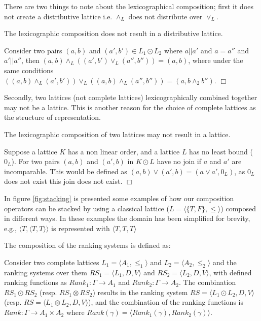 There are two things to note about the lexicographical composition; 
first it does not create a distributive lattice i.e. $\wedge_L$ does not distribute over $\vee_L$.
\begin{prop}
The lexicographic composition does not result in a distributive lattice.
\end{prop}
\begin{prof}
Consider two pairs $(a,b)$ and $(a', b') \in L_1 \odot L_2$ where $a || a'$ and $a = a''$ and $a' || a''$,
then $(a,b) \wedge_{L} ((a', b') \vee_{L} (a'', b'')) = (a,b)$,
where under the same conditions $((a,b) \wedge_{L} (a', b')) \vee_{L} ((a,b) \wedge_{L} (a'', b'')) = (a,b \wedge_2 b'')$.
$\Box$\end{prof}

Secondly, two lattices (not complete lattices) lexicographically combined together may not be a lattice. 
This is another reason for the choice of complete lattices as the structure of representation.
\begin{prop}
The lexicographic composition of two lattices may not result in a lattice.
\end{prop}
\begin{prof}
Suppose a lattice $K$ has a non linear order, and a lattice $L$ has no least bound ($0_L$). 
For two pairs $(a,b)$ and $(a',b)$ in $K \odot L$ have no join if $a$ and $a'$ are incomparable.
This would be defined as $(a,b) \vee (a',b) = (a \vee a',0_L)$, as $0_L$ does not exist this join does not exist.
$\Box$\end{prof}

In figure \ref{fig:stacking} is presented some examples of how our composition operators can be stacked
by using a classical lattice ($L = \langle \{T,F\}, \leq \rangle$) composed in different ways.
In these examples the domain has been simplified for brevity, 
e.g., $\langle T, \langle T,T\rangle\rangle$ is represented with $\langle T,T,T\rangle$

The composition of the ranking systems is defined as:
\begin{defs}
Consider two complete lattices $L_1 = \langle A_1, \leq_1 \rangle$ and $L_2 = \langle A_2,\leq_2 \rangle$ and
the ranking systems over them $RS_1 = \langle L_1,D,V \rangle $ and $RS_2 = \langle L_2,D,V \rangle$,
with defined ranking functions as $Rank_1: \Gamma \rightarrow A_1 $ and $Rank_2: \Gamma \rightarrow A_2$.
The combination $RS_1 \odot RS_2$ (resp. $RS_1 \otimes RS_2$) results in the ranking system 
$RS = \langle L_1 \odot L_2, D, V \rangle$ (resp. $RS = \langle L_1 \otimes L_2, D, V \rangle$), 
and the combination of the ranking functions is 
$Rank: \Gamma \rightarrow A_1 \times A_2$ where $Rank(\gamma) = \langle Rank_1(\gamma), Rank_2(\gamma) \rangle$.
\end{defs}

